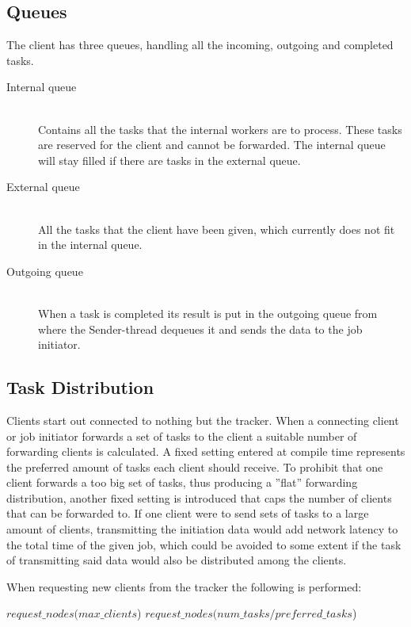 \subsection{Queues}
The client has three queues, handling all the incoming, outgoing and completed
tasks.
\begin{description}
	\item[Internal queue] \hfill \\
	Contains all the tasks that the internal workers are to process. These tasks
	are reserved for the client and cannot be forwarded. The internal queue will
	stay filled if there are tasks in the external queue.
	\item[External queue] \hfill \\
	All the tasks that the client have been given, which currently does not 
	fit in the internal queue.
	\item[Outgoing queue] \hfill \\
	When a task is completed its result is put in the outgoing queue from where
	the Sender-thread dequeues it and sends the data to the job initiator.
\end{description}

\subsection{Task Distribution}
Clients start out connected to nothing but the tracker. When a connecting client
or job initiator forwards a set of tasks to the client a suitable number of
forwarding clients is calculated. A fixed setting entered at compile time represents
the preferred amount of tasks each client should receive. To prohibit that one
client forwards a too big set of tasks, thus producing a ''flat'' forwarding
distribution, another fixed setting is introduced that caps the number of
clients that can be forwarded to. If one client were to send sets of tasks to a
large amount of clients, transmitting the initiation data would add network
latency to the total time of the given job, which could be avoided to some
extent if the task of transmitting said data would also be distributed among the
clients.

When requesting new clients from the tracker
the following is performed: \\

\begin{samepage}
\begin{algorithmic}
\STATE {}
	\STATE $request\_nodes(max\_clients$)
\ELSE
	\STATE $request\_nodes(num\_tasks/preferred\_tasks$)
\ENDIF
\end{algorithmic}
\end{samepage}

